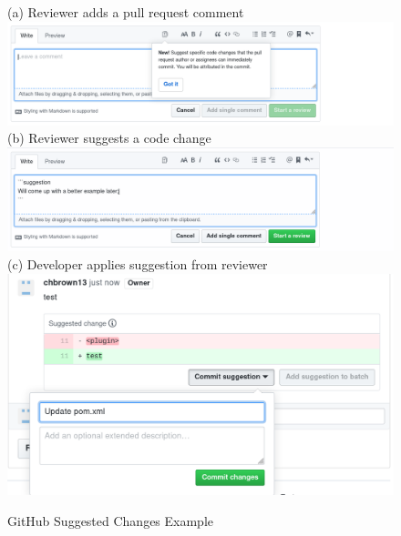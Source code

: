 
\begin{figure}[]
\centering
    (a) Reviewer adds a pull request comment \\
    \includegraphics[width=\textwidth]{images/sugg1.png}
    (b) Reviewer suggests a code change \\
    \includegraphics[width=\textwidth]{images/sugg2.png}
   (c) Developer applies suggestion from reviewer \\
    \includegraphics[width=\textwidth]{images/sugg3.png}
    \caption{GitHub Suggested Changes Example}    
    \label{fig:sugg} 
\end{figure}

